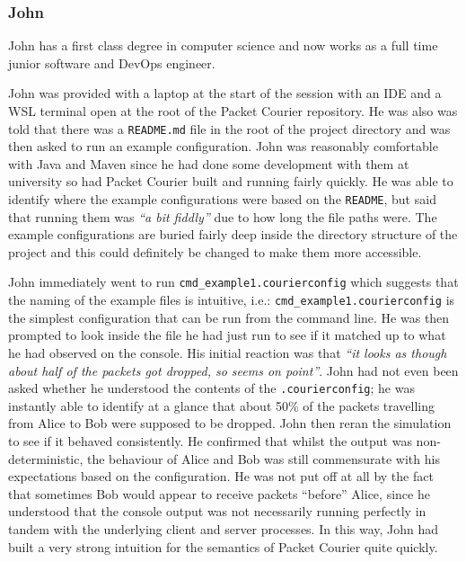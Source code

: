 \subsubsection{John}\label{subsubsection:john}

John has a first class degree in computer science and now works as a full time junior software and DevOps engineer.

John was provided with a laptop at the start of the session with an IDE and a WSL terminal open at the root of the
Packet Courier repository. He was also was told that there was a \texttt{README.md} file in the root of the project
directory and was then asked to run an example configuration. John was reasonably comfortable with Java and Maven
since he had done some development with them at university so had Packet Courier built and running fairly quickly. He
was able to identify where the example configurations were based on the \texttt{README}, but said that running them
was \emph{``a bit fiddly''} due to how long the file paths were. The example configurations are buried fairly deep
inside the directory structure of the project and this could definitely be changed to make them more accessible.

John immediately went to run \texttt{cmd\_example1.courierconfig} which suggests that the naming of the example files
is intuitive, i.e.: \texttt{cmd\_example1.courierconfig} is the simplest configuration that can be run from the
command line. He was then prompted to look inside the file he had just run to see if it matched up to what he had
observed on the console. His initial reaction was that \emph{``it looks as though about half of the packets got
dropped, so seems on point''}. John had not even been asked whether he understood the contents of the
\texttt{.courierconfig}; he was instantly able to identify at a glance that about 50\% of the packets travelling from
Alice to Bob were supposed to be dropped. John then reran the simulation to see if it behaved consistently. He
confirmed that whilst the output was non-deterministic, the behaviour of Alice and Bob was still commensurate with
his expectations based on the configuration. He was not put off at all by the fact that sometimes Bob would appear to
receive packets ``before'' Alice, since he understood that the console output was not necessarily running perfectly
in tandem with the underlying client and server processes. In this way, John had built a very strong intuition for
the semantics of Packet Courier quite quickly.

